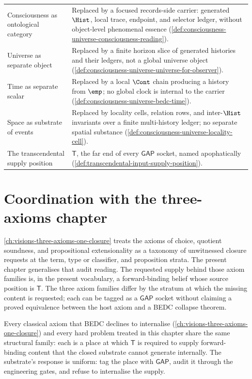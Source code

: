 \begin{longtable}{p{}p{}}
Consciousness as ontological category & Replaced by a focused records-side carrier: generated $\Hist$, local trace, endpoint, and selector ledger, without object-level phenomenal essence (\autoref{def:consciousness-universe-consciousness-reading}). \\
Universe as separate object & Replaced by a finite horizon slice of generated histories and their ledgers, not a global universe object (\autoref{def:consciousness-universe-universe-for-observer}). \\
Time as separate scalar & Replaced by a local $\Cont$ chain producing a history from $\emp$; no global clock is internal to the carrier (\autoref{def:consciousness-universe-bedc-time}). \\
Space as substrate of events & Replaced by locality cells, relation rows, and inter-$\Hist$ invariants over a finite multi-history ledger; no separate spatial substance (\autoref{def:consciousness-universe-locality-cell}). \\
The transcendental supply position & $\mathsf{T}$, the far end of every $\mathsf{GAP}$ socket, named apophatically (\autoref{def:transcendental-input-supply-position}). \\
\bottomrule
\end{longtable}

\section{Coordination with the three-axioms chapter}
\label{sec:hard-problems-coordination-three-axioms}

\autoref{ch:visions-three-axioms-one-closure} treats the axioms of choice, quotient soundness, and propositional extensionality as a taxonomy of unwitnessed closure requests at the term, type or classifier, and proposition strata. The present chapter generalises that audit reading. The requested supply behind those axiom families is, in the present vocabulary, a forward-binding belief whose source position is $\mathsf{T}$. The three axiom families differ by the stratum at which the missing content is requested; each can be tagged as a $\mathsf{GAP}$ socket without claiming a proved equivalence between the host axiom and a BEDC collapse theorem.

\begin{principle}
\label{prin:hard-problems-shared-T-socket}
Every classical axiom that BEDC declines to internalise (\autoref{ch:visions-three-axioms-one-closure}) and every hard problem treated in this chapter share the same structural family: each is a place at which $\mathsf{T}$ is required to supply forward-binding content that the closed substrate cannot generate internally. The substrate's response is uniform: tag the place with $\mathsf{GAP}$, audit it through the engineering gates, and refuse to internalise the supply.
\end{principle}

